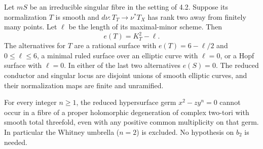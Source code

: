 
\begin{proposition}[P4.15]\hypertarget{tag-02WM}{}\label{night:P4.15}\label{stmt:P4.15}


Let $mS$ be an irreducible singular fibre in the setting of 4.2.
Suppose its normalization $T$ is smooth and $d\nu:T_T\to\nu^*T_X$
has rank two away from finitely many points. Let $\ell$ be the
length of its maximal-minor scheme. Then
\[
 e(T)=K_T^2-\ell.
\]
The alternatives for $T$ are a rational surface with
$e(T)=6-\ell/2$ and $0\leq\ell\leq6$, a minimal ruled surface
over an elliptic curve with $\ell=0$, or a Hopf surface with
$\ell=0$. In either of the last two alternatives $e(S)=0$.
The reduced conductor and singular locus are disjoint unions of
smooth elliptic curves, and their normalization maps are finite
and unramified.
\end{proposition}

\begin{proposition}[P4.16]\hypertarget{tag-02WN}{}\label{night:P4.16}\label{stmt:P4.16}


For every integer $n\geq1$, the reduced hypersurface germ
$x^2-zy^n=0$ cannot occur in a fibre of a proper holomorphic
degeneration of complex two-tori with smooth total threefold,
even with any positive common multiplicity on that germ.
In particular the Whitney umbrella ($n=2$) is excluded.
No hypothesis on $b_2$ is needed.
\end{proposition}

